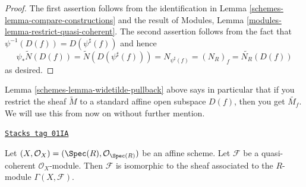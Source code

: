 \begin{proof}

The first assertion follows from the identification in
Lemma \ref{schemes-lemma-compare-constructions}
and the result of Modules, Lemma \ref{modules-lemma-restrict-quasi-coherent}.
The second assertion follows from the fact
that $\psi^{-1}(D(f)) = D(\psi^\sharp(f))$ and hence
$$
\psi_* \widetilde N(D(f)) = \widetilde N(D(\psi^\sharp(f))) =
N_{\psi^\sharp(f)} = (N_R)_f = \widetilde{N_R}(D(f))
$$
as desired.
\end{proof}

Lemma \ref{schemes-lemma-widetilde-pullback} above says in particular
that if you restrict
the sheaf $\widetilde M$ to a standard affine open subspace
$D(f)$, then you get $\widetilde{M_f}$. We will use this from
now on without further mention.

\begin{lemma}
\label{schemes-lemma-quasi-coherent-affine}
\href{https://stacks.math.columbia.edu/tag/01IA}{\texttt{Stacks tag 01IA}}

Let $(X, \mathcal{O}_X) = (\Spec(R), \mathcal{O}_{\Spec(R)})$
be an affine scheme. Let $\mathcal{F}$ be a
quasi-coherent $\mathcal{O}_X$-module. Then
$\mathcal{F}$ is isomorphic to the sheaf associated to
the $R$-module $\Gamma(X, \mathcal{F})$.
\end{lemma}

